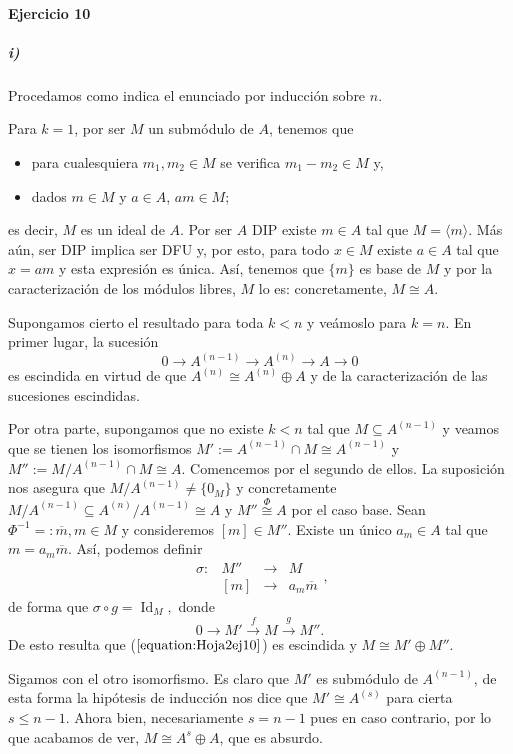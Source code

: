 \documentclass[./ejercicios.tex]{subfiles}
\begin{document}
\paragraph{Ejercicio 10}
\subparagraph{i)} Procedamos como indica el enunciado por inducción sobre $n$.

Para $k=1$, por ser $M$ un submódulo de $A$, tenemos que
\begin{itemize}
	\item para cualesquiera $m_1,m_2\in M$ se verifica $m_1-m_2\in M$ y,
	\item dados $m\in M$ y $a\in A$, $am\in M;$
\end{itemize}
es decir, $M$ es un ideal de $A$. Por ser $A$ DIP existe $m\in A$ tal que $M=\langle m\rangle$. Más aún, ser DIP implica ser DFU y, por esto, para todo $x\in M$ existe $a\in A$ tal que $x=am$ y esta expresión es única. Así, tenemos que $\{m\}$ es base de $M$ y por la caracterización de los módulos libres, $M$ lo es: concretamente, $M\cong A$.

Supongamos cierto el resultado para toda $k<n$ y veámoslo para $k=n$. En primer lugar, la sucesión
$$0\longrightarrow A^{(n-1)}\longrightarrow A^{(n)}\longrightarrow A\longrightarrow 0$$
es escindida en virtud de que $A^{(n)}\cong A^{(n)}\oplus A$ y de la caracterización de las sucesiones escindidas.

Por otra parte, supongamos que no existe $k<n$ tal que $M\subseteq A^{(n-1)}$ y veamos que se tienen los isomorfismos $M':=A^{(n-1)}\cap M\cong A^{(n-1)}$ y $M'':=M/{A^{(n-1)}\cap M}\cong A$.
Comencemos por el segundo de ellos. La suposición nos asegura que $M/{A^{(n-1)}}\neq \{0_M\}$ y concretamente $M/{A^{(n-1)}}\subseteq A^{(n)}/{A^{(n-1)}}\cong A$ y $M''\overset{\Phi}{\cong}A$ por el caso base.
Sean $\Phi^{-1}=:\overline{m},m\in M$ y consideremos $[m]\in M''$. Existe un único $a_m\in A$ tal que $m=a_m\overline{m}$. Así, podemos definir
$$\begin{array}{rrcl}
\sigma:&M''&\longrightarrow&M\\
&[m]&\longrightarrow&a_m\overline{m}
\end{array},$$
de forma que $\sigma\circ g=\operatorname{Id}_M,$ donde
\begin{equation}\label{equation:Hoja2ej10}
0\overset{}{\longrightarrow}M'\overset{f}{\longrightarrow}M\overset{g}{\longrightarrow}M''.
\end{equation}
De esto resulta que ($\ref{equation:Hoja2ej10}$) es escindida y $M\cong M'\oplus M''$.

Sigamos con el otro isomorfismo. Es claro que $M'$ es submódulo de $A^{(n-1)}$, de esta forma la hipótesis de inducción nos dice que $M'\cong A^{(s)}$ para cierta $s\le n-1$. Ahora bien, necesariamente $s=n-1$ pues en caso contrario, por lo que acabamos de ver, $M\cong A^{s}\oplus A$, que es absurdo.
\end{document}
